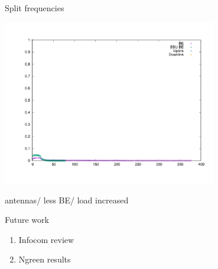 \documentclass[10 pt]{beamer}
\begin{document}
\begin{frame}{Split frequencies}



\centering \includegraphics[width=0.7\textwidth]{Split_high.pdf} 

 antennas/ less BE/ load increased 


\end{frame}







\begin{frame}{Future work}

\begin{enumerate}
\item Infocom review
\item Ngreen results 
\end{enumerate}
\end{frame}
\end{document}
